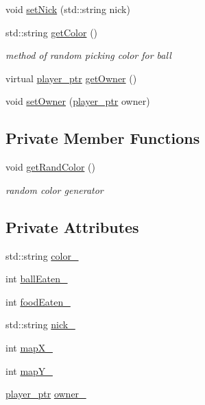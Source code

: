 \begin{DoxyCompactItemize}
void \hyperlink{classwebsocket_1_1Ball_af077870d9ace7350bf43c1f919474a09}{set\+Nick} (std\+::string nick)
\item 
std\+::string \hyperlink{classwebsocket_1_1Ball_a2453ccebc702add2a847e812b3a1bc42}{get\+Color} ()
\begin{DoxyCompactList}\small\item\em method of random picking color for ball \end{DoxyCompactList}\item 
virtual \hyperlink{namespacewebsocket_aec8d52893bdf524a1412533a63b006a3}{player\+\_\+ptr} \hyperlink{classwebsocket_1_1Ball_a7c418a9c85d74e6644d9ffa294c8df74}{get\+Owner} ()
\item 
void \hyperlink{classwebsocket_1_1Ball_ad1d6d190c2c613ffd31de211a91e13d2}{set\+Owner} (\hyperlink{namespacewebsocket_aec8d52893bdf524a1412533a63b006a3}{player\+\_\+ptr} owner)
\end{DoxyCompactItemize}
\subsection*{Private Member Functions}
\begin{DoxyCompactItemize}
\item 
void \hyperlink{classwebsocket_1_1Ball_a5de123006e71d2f604175e20e610cc86}{get\+Rand\+Color} ()
\begin{DoxyCompactList}\small\item\em random color generator \end{DoxyCompactList}\end{DoxyCompactItemize}
\subsection*{Private Attributes}
\begin{DoxyCompactItemize}
\item 
std\+::string \hyperlink{classwebsocket_1_1Ball_a792f41e9a5b72b3c8b332672620f5ea2}{color\+\_\+}
\item 
int \hyperlink{classwebsocket_1_1Ball_a33fc238593bf14f5ba704b320d9167dd}{ball\+Eaten\+\_\+}
\item 
int \hyperlink{classwebsocket_1_1Ball_acfec070b8ea69e11bb16028119a7d7cb}{food\+Eaten\+\_\+}
\item 
std\+::string \hyperlink{classwebsocket_1_1Ball_ac9c16252cac70db6b19e8047aad3b837}{nick\+\_\+}
\item 
int \hyperlink{classwebsocket_1_1Ball_ab3b1c8c9375f223abe3dfbb9e01d16e8}{map\+X\+\_\+}
\item 
int \hyperlink{classwebsocket_1_1Ball_a0b93614aa4dd113bae4a53f5196aa254}{map\+Y\+\_\+}
\item 
\hyperlink{namespacewebsocket_aec8d52893bdf524a1412533a63b006a3}{player\+\_\+ptr} \hyperlink{classwebsocket_1_1Ball_a19821c2fef55f296918cd67486d194a7}{owner\+\_\+}
\end{DoxyCompactItemize}
